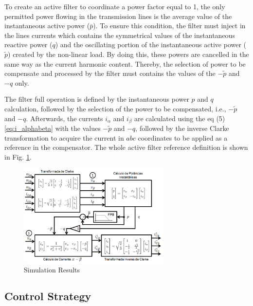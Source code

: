 To create an active filter to coordinate a power factor equal to 1, the only permitted power flowing in the transmission lines is the average value of the instantaneous active power ($\overline{p}$). To ensure this condition, the filter must inject in the lines currents which contains the symmetrical values of the instantaneous reactive power ($q$) and the oscillating portion of the instantaneous active power ($\tilde{p}$) created by the non-linear load. By doing this, these powers are cancelled in the same way as the current harmonic content. Thereby, the selection of power to be compensate and processed by the filter must contains the values of the $-\tilde{p}$ and $-q$ only.

The filter full operation is defined by the instantaneous power $p$ and $q$ calculation, followed by the selection of the power to be compensated, i.e., $-\tilde{p}$ and $-q$. Afterwards, the currents $i_{\alpha}$ and $i_{\beta}$ are calculated using the eq (5) \ref{eq:i_alphabeta} with the values $-\tilde{p}$ and $-q$, followed by the inverse Clarke transformation to acquire the current in $abc$ coordinates to be applied as a reference in the compensator. The whole active filter reference definition is shown in Fig. \ref{fig:diagrama_filtro.png}.

\begin{figure}[!th]
	\centering
	\includegraphics[width=3in]{Figures/diagrama_filtro.png}
	\caption{Simulation Results}
	\label{fig:diagrama_filtro.png}
\end{figure}


\subsection{Control Strategy}

